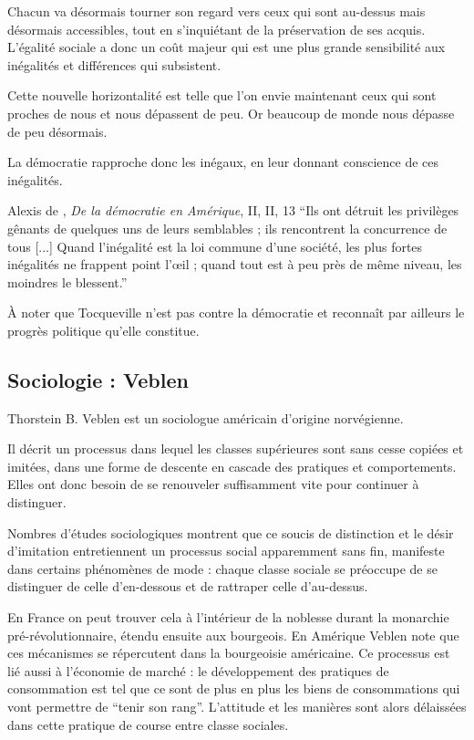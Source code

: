 	Chacun va désormais tourner son regard vers ceux qui sont au-dessus mais désormais accessibles, tout en s'inquiétant de la préservation de ses acquis.
	L'égalité sociale a donc un coût majeur qui est une plus grande sensibilité aux inégalités et différences qui subsistent.

	Cette nouvelle horizontalité est telle que l'on envie maintenant ceux qui sont proches de nous et nous dépassent de peu.
	Or beaucoup de monde nous dépasse de peu désormais.

	La démocratie rapproche donc les inégaux, en leur donnant conscience de ces inégalités.
	
	\begin{aquote}{Alexis de , \textit{De la démocratie en Amérique}, II, II, 13}
	“Ils ont détruit les privilèges gênants de quelques uns de leurs semblables ; ils rencontrent la concurrence de tous [...] Quand l'inégalité est la loi commune d'une société, les plus fortes inégalités ne frappent point l'œil ; quand tout est à peu près de même niveau, les moindres le blessent.”
	\end{aquote}

	À noter que Tocqueville n'est pas contre la démocratie et reconnaît par ailleurs le progrès politique qu'elle constitue.

\subsection{Sociologie : Veblen}

	Thorstein B. Veblen est un sociologue américain d'origine norvégienne.

	Il décrit un processus dans lequel les classes supérieures sont sans cesse copiées et imitées, dans une forme de descente en cascade des pratiques et comportements.
	Elles ont donc besoin de se renouveler suffisamment vite pour continuer à distinguer.

	Nombres d'études sociologiques montrent que ce soucis de distinction et le désir d'imitation entretiennent un processus social apparemment sans fin, manifeste dans certains phénomènes de mode : chaque classe sociale se préoccupe de se distinguer de celle d'en-dessous et de rattraper celle d'au-dessus.

	En France on peut trouver cela à l'intérieur de la noblesse durant la monarchie pré-révolutionnaire, étendu ensuite aux bourgeois.
	En Amérique Veblen note que ces mécanismes se répercutent dans la bourgeoisie américaine.
	Ce processus est lié aussi à l'économie de marché : le développement des pratiques de consommation est tel que ce sont de plus en plus les biens de consommations qui vont permettre de “tenir son rang”.
	L'attitude et les manières sont alors délaissées dans cette pratique de course entre classe sociales.

